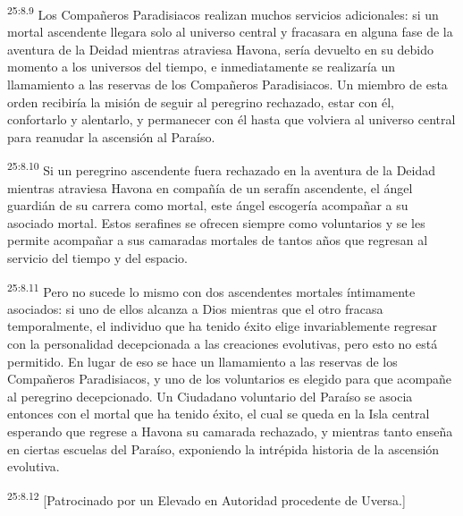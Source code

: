 \par
\textsuperscript{25:8.9} Los Compañeros Paradisiacos realizan muchos servicios adicionales: si un mortal ascendente llegara solo al universo central y fracasara en alguna fase de la aventura de la Deidad mientras atraviesa Havona, sería devuelto en su debido momento a los universos del tiempo, e inmediatamente se realizaría un llamamiento a las reservas de los Compañeros Paradisiacos. Un miembro de esta orden recibiría la misión de seguir al peregrino rechazado, estar con él, confortarlo y alentarlo, y permanecer con él hasta que volviera al universo central para reanudar la ascensión al Paraíso.

\par
\textsuperscript{25:8.10} Si un peregrino ascendente fuera rechazado en la aventura de la Deidad mientras atraviesa Havona en compañía de un serafín ascendente, el ángel guardián de su carrera como mortal, este ángel escogería acompañar a su asociado mortal. Estos serafines se ofrecen siempre como voluntarios y se les permite acompañar a sus camaradas mortales de tantos años que regresan al servicio del tiempo y del espacio.

\par
\textsuperscript{25:8.11} Pero no sucede lo mismo con dos ascendentes mortales íntimamente asociados: si uno de ellos alcanza a Dios mientras que el otro fracasa temporalmente, el individuo que ha tenido éxito elige invariablemente regresar con la personalidad decepcionada a las creaciones evolutivas, pero esto no está permitido. En lugar de eso se hace un llamamiento a las reservas de los Compañeros Paradisiacos, y uno de los voluntarios es elegido para que acompañe al peregrino decepcionado. Un Ciudadano voluntario del Paraíso se asocia entonces con el mortal que ha tenido éxito, el cual se queda en la Isla central esperando que regrese a Havona su camarada rechazado, y mientras tanto enseña en ciertas escuelas del Paraíso, exponiendo la intrépida historia de la ascensión evolutiva.

\par
\textsuperscript{25:8.12} [Patrocinado por un Elevado en Autoridad procedente de Uversa.]